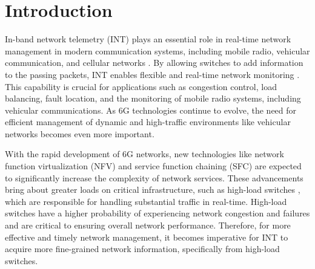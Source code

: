 \documentclass[journal]{IEEEtran}
\begin{document}
\IEEEpeerreviewmaketitle
\vspace{-1em}
\section{Introduction}
\label{section1}
In-band network telemetry (INT) plays an essential role in real-time network management in modern communication systems, including mobile radio, vehicular communication, and cellular networks \cite{1}. By allowing switches to add information to the passing packets, INT enables flexible and real-time network monitoring \cite{5}. This capability is crucial for applications such as congestion control, load balancing, fault location, and the monitoring of mobile radio systems, including vehicular communications\cite{2, 4}.  
As 6G technologies continue to evolve, the need for efficient management of dynamic and high-traffic environments like vehicular networks becomes even more important.

With the rapid development of 6G networks, new technologies like network function virtualization (NFV) and service function chaining (SFC) are expected to significantly increase the complexity of network services.   These advancements bring about greater loads on critical infrastructure, such as high-load switches \cite{8}, which are responsible for handling substantial traffic in real-time. 
High-load switches have a higher probability of experiencing network congestion and failures and are critical to ensuring overall network performance.
Therefore, for more effective and timely network management, it becomes imperative for INT to acquire more fine-grained network information, specifically from high-load switches. 
\end{document}
